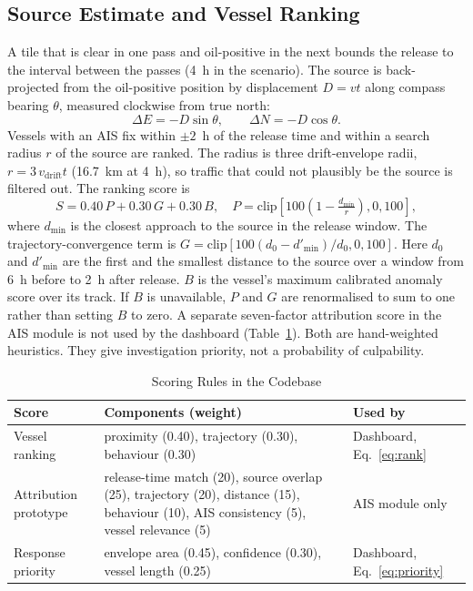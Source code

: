 \documentclass[conference]{IEEEtran}
\begin{document}
\subsection{Source Estimate and Vessel Ranking}
A tile that is clear in one pass and oil-positive in the next bounds the release to the
interval between the passes (4~h in the scenario). The source is back-projected from the
oil-positive position by displacement $D=vt$ along compass bearing $\theta$, measured
clockwise from true north:
\begin{equation}
\Delta E=-D\sin\theta,\qquad \Delta N=-D\cos\theta.
\end{equation}
Vessels with an AIS fix within $\pm2$~h of the release time and within a search radius
$r$ of the source are ranked. The radius is three drift-envelope radii, $r=3\,v_{\mathrm{drift}}t$
(16.7~km at 4~h), so traffic that could not plausibly be the source is filtered out. The
ranking score is
\begin{equation}
S=0.40\,P+0.30\,G+0.30\,B,\quad P=\mathrm{clip}\!\left[100\left(1-\tfrac{d_{\min}}{r}\right),0,100\right],
\label{eq:rank}
\end{equation}
where $d_{\min}$ is the closest approach to the source in the release window. The
trajectory-convergence term is $G=\mathrm{clip}[100(d_0-d'_{\min})/d_0,0,100]$. Here $d_0$
and $d'_{\min}$ are the first and the smallest distance to the source over a window from
6~h before to 2~h after release. $B$ is the vessel's maximum calibrated anomaly score over
its track. If $B$ is unavailable, $P$ and $G$ are renormalised to sum to one rather than setting $B$
to zero. A separate seven-factor attribution score in the AIS module is not used by the
dashboard (Table~\ref{tab:scores}). Both are hand-weighted heuristics. They give
investigation priority, not a probability of culpability.

\begin{table}[t]
\caption{Scoring Rules in the Codebase}
\label{tab:scores}
\centering
\footnotesize
\begin{tabular}{@{}p{1.6cm}p{4.0cm}p{1.6cm}@{}}
\toprule
Score & Components (weight) & Used by \\
\midrule
Vessel ranking & proximity (0.40), trajectory (0.30), behaviour (0.30) & Dashboard, Eq.~\eqref{eq:rank} \\
Attribution prototype & release-time match (20), source overlap (25), trajectory (20), distance (15), behaviour (10), AIS consistency (5), vessel relevance (5) & AIS module only \\
Response priority & envelope area (0.45), confidence (0.30), vessel length (0.25) & Dashboard, Eq.~\eqref{eq:priority} \\
\bottomrule
\end{tabular}
\end{table}
\end{document}
